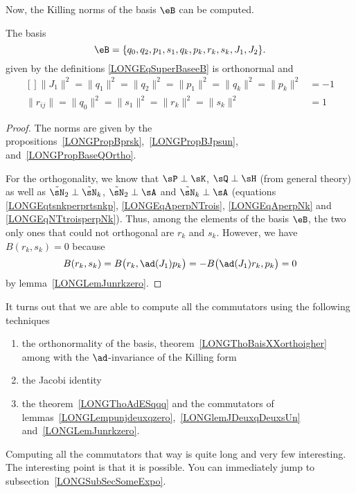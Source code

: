 Now, the Killing norms of the basis $\eB$ can be computed.
\begin{theorem}		\label{LONGThoBaisXXorthoigher}
	The basis
	\begin{equation}
		\eB=\{ q_0,q_2,p_1,s_1,q_k,p_k,r_k,s_k,J_1,J_2 \}.
	\end{equation}
	given by the definitions \eqref{LONGEqSuperBaseeB}  is orthonormal and
	\begin{equation}
		\begin{aligned}[]
			\| J_1 \|^2=\| q_1 \|^2=\| q_2 \|^2=\| p_1 \|^2=\| q_k \|^2=\| p_k \|^2 & =-1 \\
			\| r_{ij} \|=\| q_0 \|^2=\| s_1 \|^2=\| r_k \|^2=\| s_k \|^2            & =1
		\end{aligned}
	\end{equation}
\end{theorem}

\begin{proof}
	The norms are given by the propositions~\ref{LONGPropBprsk},~\ref{LONGPropBJpsun}, and~\ref{LONGPropBaseQOrtho}.

	For the orthogonality, we know that $\sP\perp\sK$, $\sQ\perp\sH$ (from general theory) as well as $\tilde\sN_2\perp\tilde\sN_k$, $\tilde\sN_2\perp\sA$ and $\tilde\sN_k\perp\sA$ (equations \eqref{LONGEqtsnkperprtsnkp}, \eqref{LONGEqAperpNTrois}, \eqref{LONGEqAperpNk} and \eqref{LONGEqNTtroisperpNk}). Thus, among the elements of the basis $\eB$, the two only ones that could not orthogonal are $r_k$ and $s_k$. However, we have $B(r_k,s_k)=0$ because
	\begin{equation}
		B(r_k,s_k)=B\big( r_k,\ad(J_1)p_k \big)=-B\big( \ad(J_1)r_k,p_k \big)=0
	\end{equation}
	by lemma~\ref{LONGLemJunrkzero}.

\end{proof}


It turns out that we are able to compute all the commutators using the following techniques
\begin{enumerate}

	\item
	      the orthonormality of the basis, theorem~\ref{LONGThoBaisXXorthoigher} among with the $\ad$-invariance of the Killing form
	\item
	      the Jacobi identity
	\item
	      the theorem~\ref{LONGThoAdESqqq} and the commutators of lemmas~\ref{LONGLempunjdeuxqzero},~\ref{LONGlemJDeuxqDeuxsUn} and~\ref{LONGLemJunrkzero}.

\end{enumerate}
Computing all the commutators that way is quite long and very few interesting. The interesting point is that it is possible. You can immediately jump to subsection~\ref{LONGSubSecSomeExpo}.

